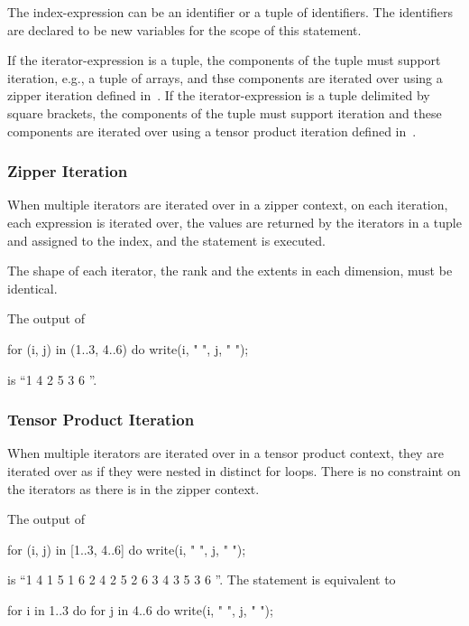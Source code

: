The index-expression can be an identifier or a tuple of identifiers.
The identifiers are declared to be new variables for the scope of this
statement.

If the iterator-expression is a tuple, the components of the tuple
must support iteration, e.g., a tuple of arrays, and thse components
are iterated over using a zipper iteration defined
in~.  If the iterator-expression is a tuple
delimited by square brackets, the components of the tuple must support
iteration and these components are iterated over using a tensor
product iteration defined in~.

\subsubsection{Zipper Iteration}
\label{Zipper_Iteration}

When multiple iterators are iterated over in a zipper context, on each
iteration, each expression is iterated over, the values are returned
by the iterators in a tuple and assigned to the index, and the
statement is executed.

The shape of each iterator, the rank and the extents in each
dimension, must be identical.

\begin{example}
The output of
\begin{chapel}
for (i, j) in (1..3, 4..6) do
  write(i, " ", j, " ");
\end{chapel}
is ``1 4 2 5 3 6 ''.
\end{example}

\subsubsection{Tensor Product Iteration}
\label{Tensor_Product_Iteration}

When multiple iterators are iterated over in a tensor product context,
they are iterated over as if they were nested in distinct for loops.
There is no constraint on the iterators as there is in the zipper
context.

\begin{example}
The output of
\begin{chapel}
for (i, j) in [1..3, 4..6] do
  write(i, " ", j, " ");
\end{chapel}
is ``1 4 1 5 1 6 2 4 2 5 2 6 3 4 3 5 3 6 ''. The statement is
equivalent to
\begin{chapel}
for i in 1..3 do
  for j in 4..6 do
    write(i, " ", j, " ");
\end{chapel}
\end{example}

